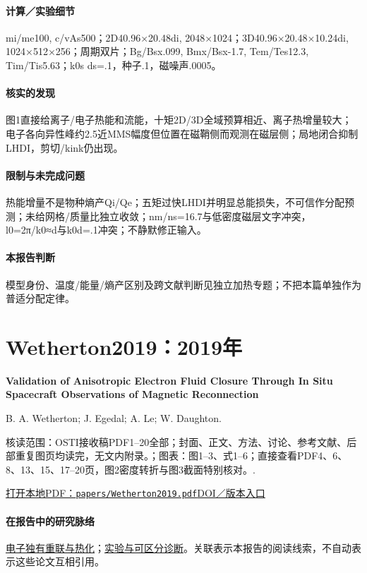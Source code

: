 \paragraph{计算／实验细节}mi/me100, c/vAs500；2D40.96×20.48di, 2048×1024；3D40.96×20.48×10.24di, 1024×512×256；周期双片；Bg/Bsx.099, Bmx/Bsx-1.7, Tem/Tes12.3, Tim/Tis5.63；k0s ds=.1，种子.1，磁噪声.0005。

\paragraph{核实的发现}图1直接给离子/电子热能和流能，十矩2D/3D全域预算相近、离子热增量较大；电子各向异性峰约2.5近MMS幅度但位置在磁鞘侧而观测在磁层侧；局地闭合抑制LHDI，剪切/kink仍出现。

\paragraph{限制与未完成问题}热能增量不是物种熵产Qi/Qe；五矩过快LHDI并明显总能损失，不可信作分配预测；未给网格/质量比独立收敛；nm/ns=16.7与低密度磁层文字冲突，l0=2π/k0≈d与k0d=.1冲突；不静默修正输入。

\paragraph{本报告判断}模型身份、温度/能量/熵产区别及跨文献判断见独立加热专题；不把本篇单独作为普适分配定律。

\section{Wetherton2019：2019年}\label{paper:Wetherton2019}

\textbf{Validation of Anisotropic Electron Fluid Closure Through In Situ Spacecraft Observations of Magnetic Reconnection}\citep{Wetherton2019}\

B. A. Wetherton;  J. Egedal;  A. Le;  W. Daughton.

\textsf{核读范围：}OSTI接收稿PDF1–20全部；封面、正文、方法、讨论、参考文献、后部重复图页均读完，无文内附录。；\textsf{图表：}图1–3、式1–6；直接查看PDF4、6、8、13、15、17–20页，图2密度转折与图3截面特别核对。.

\href{run:papers/Wetherton2019.pdf}{打开本地PDF：\texttt{papers/Wetherton2019.pdf}}\quad\href{https://doi.org/10.1029/2019GL083119}{DOI／版本入口}

\paragraph{在报告中的研究脉络}\hyperref[story:energy]{电子独有重联与热化}；\hyperref[story:diagnostic]{实验与可区分诊断}。关联表示本报告的阅读线索，不自动表示这些论文互相引用。

